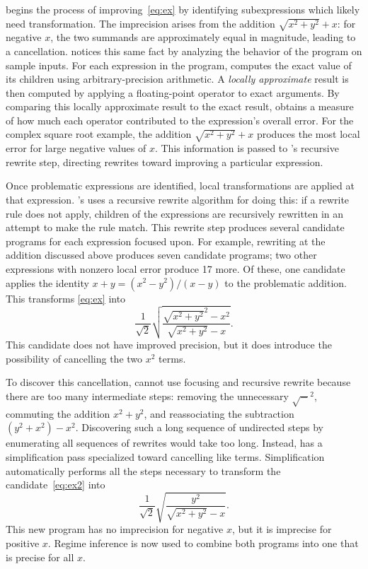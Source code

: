\documentclass[paper.tex]{subfiles}
\begin{document}
\casio begins the process of improving~\eqref{eq:ex}
  by identifying subexpressions
  which likely need transformation.
The imprecision arises from the addition $\sqrt{x^2 + y^2} + x$:
  for negative $x$,
  the two summands are approximately equal in magnitude,
  leading to a cancellation.
\casio notices this same fact
  by analyzing the behavior of the program on sample inputs.
For each expression in the program,
  \casio computes the exact value of its children
  using arbitrary-precision arithmetic.
A \emph{locally approximate} result is then computed
  by applying a floating-point operator to exact arguments.
By comparing this locally approximate result to the exact result,
  \casio obtains a measure of how much each operator
  contributed to the expression's overall error.
For the complex square root example,
  the addition $\sqrt{x^2 + y^2} + x$ produces the most local error
  for large negative values of $x$.
This information is passed to \casio's recursive rewrite step,
  directing rewrites toward improving a particular expression.

Once problematic expressions are identified,
  local transformations are applied at that expression.
\casio's uses a recursive rewrite algorithm for doing this:
  if a rewrite rule does not apply,
  children of the expressions are recursively rewritten
  in an attempt to make the rule match.
This rewrite step produces several candidate programs
  for each expression focused upon.
For example, rewriting at the addition discussed above
  produces seven candidate programs;
  two other expressions with nonzero local error produce 17 more.
Of these, one candidate applies the identity
  $x + y = (x^2 - y^2) / (x - y)$ to the problematic addition.
This transforms \eqref{eq:ex} into
\begin{equation} \label{eq:ex2}
  \frac1{\sqrt2} \sqrt{\frac{\sqrt{x^2 + y^2}^2 - x^2}{\sqrt{x^2 + y^2} - x}}.
\end{equation}
This candidate does not have improved precision,
  but it does introduce the possibility
  of cancelling the two $x^2$ terms.

To discover this cancellation,
  \casio cannot use focusing and recursive rewrite
  because there are too many intermediate steps:
  removing the unnecessary $\sqrt{-}^2$,
  commuting the addition $x^2 + y^2$,
  and reassociating the subtraction $(y^2 + x^2) - x^2$.
Discovering such a long sequence of undirected steps
  by enumerating all sequences of rewrites
  would take too long.
Instead, \casio has a simplification pass
  specialized toward cancelling like terms.
Simplification automatically performs all the steps necessary
  to transform the candidate~\eqref{eq:ex2} into
\begin{equation} \label{eq:ex3}
  \frac1{\sqrt2} \sqrt{\frac{y^2}{\sqrt{x^2 + y^2} - x}}.
\end{equation}
This new program has no imprecision for negative $x$,
  but it is imprecise for positive $x$.
Regime inference is now used to combine both programs
  into one that is precise for all $x$.
\end{document}
